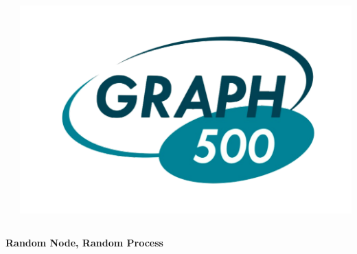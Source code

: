 \documentclass[final]{beamer}
\begin{document}
\begin{frame}[t]
\begin{columns}[t]
\begin{column}{0.60\paperwidth}
\begin{columns}[t,totalwidth=0.60\paperwidth]
\begin{column}{0.28\paperwidth}
\begin{columns}[t,totalwidth=0.28\paperwidth]
\begin{column}{0.12\paperwidth}
							\end{column}
							\begin{column}{0.12\paperwidth}
								\begin{center} \includegraphics[width=0.12\paperwidth]{img/logo_graph500} \end{center}
							\end{column}
						\end{columns}
					\end{column}
				\end{columns}
				\begin{columns}[t,totalwidth=0.60\paperwidth]
					\begin{column}{0.28\paperwidth}
						\begin{center} \bf{Random Node, Random Process} \end{center}
						\begin{columns}[t,totalwidth=0.28\paperwidth]
							\begin{column}{0.12\paperwidth}

\end{column}
\end{columns}
\end{column}
\end{columns}
\end{column}
\end{columns}
\end{frame}
\end{document}
